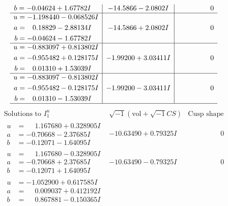 \documentclass[1p]{elsarticle_modified}
\theoremstyle{definition}
\newcommand{\I}{\sqrt{-1}}
\begin{document}
$$\begin{array}{c|c|c}
\begin{aligned}
b &= -0.04624 + 1.67782 I\end{aligned}
 & -14.5866 - 2.0802 I & \phantom{-0.000000 } 0 \\ \hline\begin{aligned}
u &= -1.198440 - 0.068526 I \\
a &= \phantom{-}0.18829 - 2.88134 I \\
b &= -0.04624 - 1.67782 I\end{aligned}
 & -14.5866 + 2.0802 I & \phantom{-0.000000 } 0 \\ \hline\begin{aligned}
u &= -0.883097 + 0.813802 I \\
a &= -0.955482 + 0.128175 I \\
b &= \phantom{-}0.01310 + 1.53039 I\end{aligned}
 & -1.99200 + 3.03411 I & \phantom{-0.000000 } 0 \\ \hline\begin{aligned}
u &= -0.883097 - 0.813802 I \\
a &= -0.955482 - 0.128175 I \\
b &= \phantom{-}0.01310 - 1.53039 I\end{aligned}
 & -1.99200 - 3.03411 I & \phantom{-0.000000 } 0\\
 \hline 
 \end{array}$$\newpage$$\begin{array}{c|c|c}  
\text{Solutions to }I^u_{1}& \I (\text{vol} + \sqrt{-1}CS) & \text{Cusp shape}\\
 \hline 
\begin{aligned}
u &= \phantom{-}1.167680 + 0.328905 I \\
a &= -0.70668 - 2.37685 I \\
b &= -0.12071 - 1.64095 I\end{aligned}
 & -10.63490 + 0.79325 I & \phantom{-0.000000 } 0 \\ \hline\begin{aligned}
u &= \phantom{-}1.167680 - 0.328905 I \\
a &= -0.70668 + 2.37685 I \\
b &= -0.12071 + 1.64095 I\end{aligned}
 & -10.63490 - 0.79325 I & \phantom{-0.000000 } 0 \\ \hline\begin{aligned}
u &= -1.052900 + 0.617585 I \\
a &= \phantom{-}0.009037 + 0.412192 I \\
b &= \phantom{-}0.867881 - 0.150365 I\end{aligned}

\end{array}$$
\end{document}
